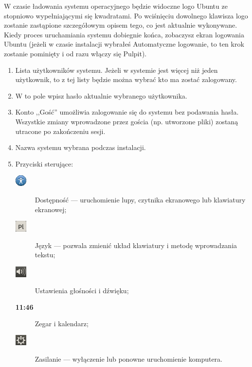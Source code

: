 W czasie ładowania systemu operacyjnego będzie widoczne logo Ubuntu ze stopniowo wypełniającymi się kwadratami. Po wciśnięciu dowolnego klawisza logo zostanie zastąpione szczegółowym opisem tego, co jest aktualnie wykonywane.
Kiedy proces uruchamiania systemu dobiegnie końca, zobaczysz ekran logowania Ubuntu (jeżeli w czasie instalacji wybrałeś \textcolor{ubuntu_orange}{Automatyczne logowanie}, to ten krok zostanie pominięty i od razu włączy się Pulpit).
\begin{enumerate}[label=\protect\circled{\arabic*}]
\item Lista użytkowników systemu. Jeżeli w systemie jest więcej niż jeden użytkownik, to z tej listy będzie można wybrać kto ma zostać zalogowany.
\item W to pole wpisz hasło aktualnie wybranego użytkownika.
\item Konto ,,Gość'' umożliwia zalogowanie się do systemu bez podawania hasła. Wszystkie zmiany wprowadzone przez gościa (np. utworzone pliki) zostaną utracone po zakończeniu sesji.
\item Nazwa systemu wybrana podczas instalacji.
\item Przyciski sterujące:
\begin{description}
\item[\includegraphics{images/ikony_dostempnosc.png}] \textcolor{ubuntu_orange}{Dostępność} --- uruchomienie lupy, czytnika ekranowego lub klawiatury ekranowej;
\item[\includegraphics{images/ikony_jezyk.png}] \textcolor{ubuntu_orange}{Język} --- pozwala zmienić układ klawiatury i metodę wprowadzania tekstu;
\item[\includegraphics{images/ikony_dzwiek.png}] \textcolor{ubuntu_orange}{Ustawienia głośności i dźwięku};
\item[\textbf{11:46}] \textcolor{ubuntu_orange}{Zegar i kalendarz};
\item[\includegraphics{images/ikony_zasilanie.png}] \textcolor{ubuntu_orange}{Zasilanie} --- wyłączenie lub ponowne uruchomienie komputera.
\end{description}
\end{enumerate}
\clearpage
